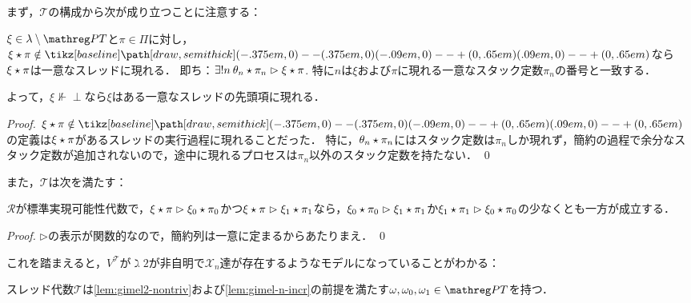 \documentclass[realisability.tex]{subfiles}
\begin{document}
まず，$\mathcal{T}$の構成から次が成り立つことに注意する：
\begin{lemma}\label{lem:uniq-thread}
 $\xi \in \lambda \setminus \PT$と$\pi \in \Pi$に対し，$\xi \cons \pi \notin \pole$なら$\xi \mathbin{\star} \pi$は一意なスレッドに現れる．
 即ち：$\exists! n \: \theta_n \mathbin{\star} \pi_n \mathrel{\rhd} \xi \mathbin{\star} \pi$.
 特に$n$は$\xi$および$\pi$に現れる一意なスタック定数$\pi_n$の番号と一致する．

 よって，$\xi \nVdash \perp$なら$\xi$はある一意なスレッドの先頭項に現れる．
\end{lemma}
\begin{proof}
 $\xi \cons \pi \notin \pole$の定義は$\xi \mathbin{\star} \pi$があるスレッドの実行過程に現れることだった．
 特に，$\theta_n \mathbin{\star} \pi_n$にはスタック定数は$\pi_n$しか現れず，簡約の過程で余分なスタック定数が追加されないので，途中に現れるプロセスは$\pi_n$以外のスタック定数を持たない． \qed
\end{proof}
また，$\mathcal{T}$は次を満たす：
\begin{theorem}\label{thm:strong-cr}
 $\mathcal{R}$が標準実現可能性代数で，$\xi \mathbin{\star} \pi \mathrel{\rhd} \xi_0 \mathbin{\star} \pi_0$かつ$\xi \mathbin{\star} \pi \mathrel{\rhd} \xi_1 \mathbin{\star} \pi_1$なら，$\xi_0 \mathbin{\star} \pi_0 \mathrel{\rhd} \xi_1 \mathbin{\star} \pi_1$か$\xi_1 \mathbin{\star} \pi_1 \mathrel{\rhd} \xi_0 \mathbin{\star} \pi_0$の少なくとも一方が成立する．
\end{theorem}
\begin{proof}
 $\rhd$の表示が関数的なので，簡約列は一意に定まるからあたりまえ． \qed
\end{proof}
これを踏まえると，$V^{\mathcal{T}}$が$\gimel 2$が非自明で$\mathcal{X}_n$達が存在するようなモデルになっていることがわかる：
\begin{lemma}
 スレッド代数$\mathcal{T}$は\cref{lem:gimel2-nontriv}および\cref{lem:gimel-n-incr}の前提を満たす$\omega, \omega_0, \omega_1 \in \PT$を持つ．
\end{lemma}
\end{document}
